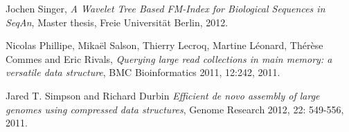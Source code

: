 \begin{thebibliography}{99}
        Jochen Singer,
        \emph{A Wavelet Tree Based FM-Index for Biological Sequences in SeqAn},
        Master thesis,
        Freie Universit\"{a}t Berlin,
        2012.
        
        Nicolas Phillipe, Mika\"{e}l Salson, Thierry Lecroq, Martine Léonard, Thér\`{e}se Commes and Eric Rivals,
        \emph{Querying large read collections in main memory: a versatile data structure},
        BMC Bioinformatics 2011, 12:242,
        2011.
        
        Jared T. Simpson and Richard Durbin
        \emph{Efficient de novo assembly of large genomes using compressed data structures},
        Genome Research 2012, 22: 549-556,
        2011.

\end{thebibliography}